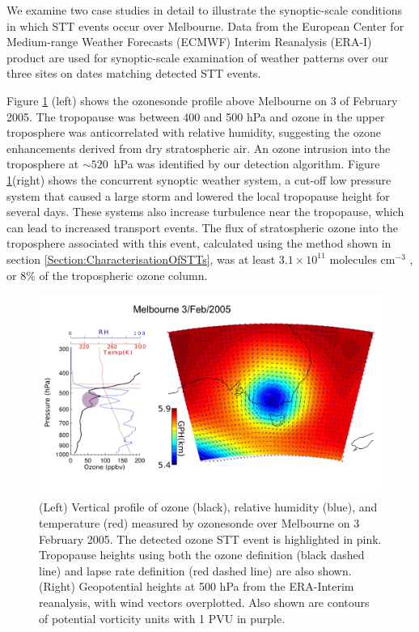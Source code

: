 \documentclass{article}
\begin{document}
  We examine two case studies in detail to illustrate the synoptic-scale conditions in which STT events occur over Melbourne.
  Data from the European Center for Medium-range Weather Forecasts (ECMWF) Interim Reanalysis (ERA-I) \citep{Dee2011} product are used for synoptic-scale examination of weather patterns over our three sites on dates matching detected STT events.
  
  Figure \ref{fig:Melbourne20050203} (left) shows the ozonesonde profile above Melbourne on 3 of February 2005.
  The tropopause was between 400 and 500 hPa and ozone in the upper troposphere was anticorrelated with relative humidity, suggesting the ozone enhancements derived from dry stratospheric air. 
  An ozone intrusion into the troposphere at $\sim520$~hPa was identified by our detection algorithm.
  Figure \ref{fig:Melbourne20050203}(right) shows the concurrent synoptic weather system, a cut-off low pressure system that caused a large storm and lowered the local tropopause height for several days.
  These systems also increase turbulence near the tropopause, which can lead to increased transport events.
  The flux of stratospheric ozone into the troposphere associated with this event, calculated using the method shown in section \ref{Section:CharacterisationOfSTTs}, was at least $3.1 \times 10^{11}$ molecules cm$^{-3}$ , or 8\% of the tropospheric ozone column.

  \begin{figure}[!htbp]
    \begin{center}
    \includegraphics[width=1.0\columnwidth]{figures/Melbourne20050203.png}
    \caption{(Left) Vertical profile of ozone (black), relative humidity (blue), and temperature (red) measured by ozonesonde over Melbourne on 3 February 2005.
    The detected ozone STT event is highlighted in pink.
    Tropopause heights using both the ozone definition (black dashed line) and lapse rate definition (red dashed line) are also shown.
    (Right) Geopotential heights at 500 hPa from the ERA-Interim reanalysis, with wind vectors overplotted.
    Also shown are contours of potential vorticity units with 1 PVU in purple.}
    \label{fig:Melbourne20050203}
    \end{center}
  \end{figure}
  
\end{document}
